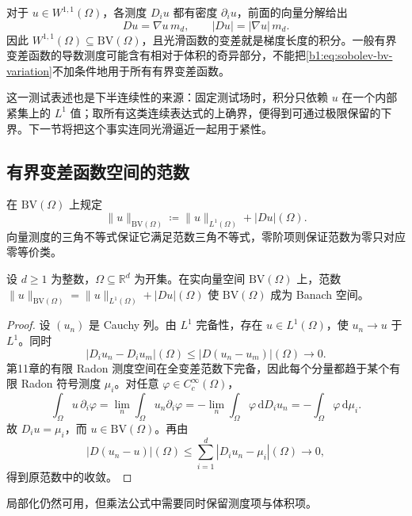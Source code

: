 对于 \(u\in W^{1,1}(\Omega)\)，各测度 \(D_i u\) 都有密度 \(\partial_i u\)，前面的向量分解给出
\begin{equation}\label{b1:eq:sobolev-bv-variation}
 Du=\nabla u\,m_d,\qquad
 |Du|=|\nabla u|\,m_d.
\end{equation}
因此 \(W^{1,1}(\Omega)\subseteq \mathrm{BV}(\Omega)\)，且光滑函数的变差就是梯度长度的积分。一般有界变差函数的导数测度可能含有相对于体积的奇异部分，不能把\eqref{b1:eq:sobolev-bv-variation}不加条件地用于所有有界变差函数。

\ProseParagraphBreak

这一测试表述也是下半连续性的来源：固定测试场时，积分只依赖 \(u\) 在一个内部紧集上的 \(L^1\) 值；取所有这类连续表达式的上确界，便得到可通过极限保留的下界。下一节将把这个事实连同光滑逼近一起用于紧性。

\subsection{有界变差函数空间的范数}
\label{b1:subsec:270103}

在 \(\mathrm{BV}(\Omega)\) 上规定
\[
 \|u\|_{\mathrm{BV}(\Omega)}\coloneqq\|u\|_{L^1(\Omega)}+|Du|(\Omega).
\]
向量测度的三角不等式保证它满足范数三角不等式，零阶项则保证范数为零只对应零等价类。

\begin{proposition}\label{b1:prop:bv-complete}
设 \(d\ge1\) 为整数，\(\Omega\subseteq\mathbb R^d\) 为开集。在实向量空间 \(\mathrm{BV}(\Omega)\) 上，范数 \(\|u\|_{\mathrm{BV}(\Omega)}=\|u\|_{L^1(\Omega)}+|Du|(\Omega)\) 使 \(\mathrm{BV}(\Omega)\) 成为 Banach 空间。
\end{proposition}
\begin{proof}
设 \((u_n)\) 是 Cauchy 列。由 \(L^1\) 完备性，存在 \(u\in L^1(\Omega)\)，使 \(u_n\to u\) 于 \(L^1\)。同时
\[
 |D_i u_n-D_i u_m|(\Omega)
 \le|D(u_n-u_m)|(\Omega)\longrightarrow0.
\]
第11章的有限 Radon 测度空间在全变差范数下完备，因此每个分量都趋于某个有限 Radon 符号测度 \(\mu_i\)。对任意 \(\varphi\in C_c^\infty(\Omega)\)，
\[
 \int_\Omega u\,\partial_i\varphi
 =\lim_n\int_\Omega u_n\partial_i\varphi
 =-\lim_n\int_\Omega\varphi\,\mathrm dD_i u_n
 =-\int_\Omega\varphi\,\mathrm d\mu_i.
\]
故 \(D_i u=\mu_i\)，而 \(u\in \mathrm{BV}(\Omega)\)。再由
\[
 |D(u_n-u)|(\Omega)
 \le\sum_{i=1}^d|D_i u_n-\mu_i|(\Omega)\longrightarrow0,
\]
得到原范数中的收敛。
\end{proof}

局部化仍然可用，但乘法公式中需要同时保留测度项与体积项。

